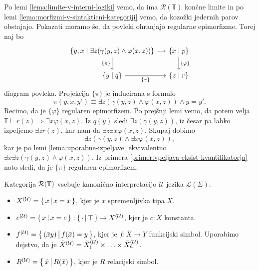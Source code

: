 \documentclass[../kategoricna_logika.tex]{subfiles}
\begin{document}
\begin{dokaz}
  Po lemi \ref{lema:limite-v-interni-logiki} vemo, da ima
  $\mathcal{R}(\mathbb{T})$ končne limite in po lemi
  \ref{lema:morfizmi-v-sintakticni-kategoriji} vemo, da kozožki
  jedernih parov obstajajo. Pokazati moramo še, da povleki ohranjajo
  regularne epimorfizme.  Torej naj bo
  \begin{equation*}
    \begin{tikzcd}[column sep=small]
      \{y,x \mid \exists z(\gamma(y,z) \land \varphi(x,z))\} \ar[d,
      "\{\pi\}"'] \ar[r] &
      \{ x \mid p\} \ar[d, "\{\varphi\}"] \\
      \{y \mid q\} \ar[r, "\{\gamma\}"'] & \{z \mid r\}
    \end{tikzcd}
  \end{equation*}
  diagram povleka. Projekcija  $\{\pi\}$ je inducirana s formulo
  \[ \pi(y,x,y') \equiv \exists z(\gamma(y,z) \land \varphi(x,z))
    \land y=y'.\]
  Recimo, da je $\{\varphi\}$ regularen
  epimorfizem. Po prejšnji lemi vemo, da potem velja
  $\mathbb{T} \vdash r(z) \Rightarrow \exists x \varphi(x,z)$.
  Iz $q(y)$ sledi $\exists z(\gamma(y,z))$, iz česar pa lahko izpeljemo $\exists z r(z)$,
  kar nam da $\exists z \exists x \varphi(x,z)$. Skupaj dobimo
  \[ \exists z(\gamma(y,z) \land \exists x \varphi(x,z)),\]
  kar je po
  lemi \ref{lema:uporabne-izpeljave} ekvivalentno
  $\exists x \exists z(\gamma(y,z) \land \varphi(x,z))$.  Iz primera
  \ref{primer:vpeljava-eksist-kvantifikatorja} nato sledi, da je
  $\{\pi\}$ regularen epimorfizem.
\end{dokaz}
\begin{definicija}
  Kategorija $\mathcal{R}(\T)$ vsebuje kanonično interpretacijo
  $\mathcal{U}$ jezika $\mathcal{L}(\Sigma)$:
  \begin{itemize}
  \item $\interp[\mathcal{U}]{X} = \set{x\,\middle|\, x = x}$, kjer je
    $x$ spremenljivka tipa $X$.
  \item
    $\interp[\mathcal{U}]{c} = \set{x\,\middle|\, x = c} :
    \set{\cdot\,\middle|\, \top} \to \interp[\mathcal{U}]{X}$, kjer je
    $c:X$ konstanta.
  \item
    $\interp[\mathcal{U}]{f} = \set{(\bar{x}y)\,\middle|\, f(\bar{x})
      = y}$, kjer je $f : \bar{X}\to Y$ funkcijski simbol. Uporabimo
    dejstvo, da je
    $\bar{X}^{(\mathcal{U})} = \interp[\mathcal{U}]{\bar{X}_1} \times
    \ldots \times \interp[\mathcal{U}]{\bar{X}_n}$.
  \item
    $\interp[\mathcal{U}]{R} = \set{\bar{x}\,\middle|\, R(\bar{x})}$,
    kjer je $R$ relacijski simbol.
  \end{itemize}
\end{definicija}
\end{document}
